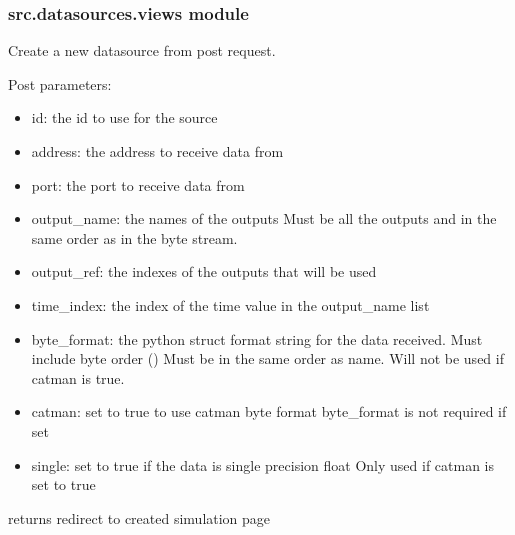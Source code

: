\documentclass[letterpaper,10pt,english]{sphinxmanual}
\begin{document}
\subsubsection{src.datasources.views module}
\label{\detokenize{src.datasources:module-src.datasources.views}}\label{\detokenize{src.datasources:src-datasources-views-module}}

\begin{fulllineitems}
\label{\detokenize{src.datasources:src.datasources.views.datasource_create}}
Create a new datasource from post request.

Post parameters:
\begin{itemize}
\item {} 
id: the id to use for the source

\item {} 
address: the address to receive data from

\item {} 
port: the port to receive data from

\item {} 
output\_name: the names of the outputs
Must be all the outputs and in the same order as in the byte stream.

\item {} 
output\_ref: the indexes of the outputs that will be used

\item {} 
time\_index: the index of the time value in the output\_name list

\item {} 
byte\_format: the python struct format string for the data received.
Must include byte order ()
Must be in the same order as name.
Will not be used if catman is true.

\item {} 
catman: set to true to use catman byte format
byte\_format is not required if set

\item {} 
single: set to true if the data is single precision float
Only used if catman is set to true

\end{itemize}

returns redirect to created simulation page

\end{fulllineitems}
\end{document}
